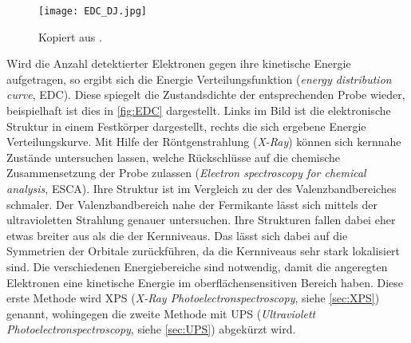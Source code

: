         \begin{figure}
            \centering
            \texttt{[image: EDC\_DJ.jpg]}
            \caption{Kopiert aus \cite{oura_surface_2003}.}
            \label{fig:EDC}
        \end{figure}
        Wird die Anzahl detektierter Elektronen gegen ihre kinetische Energie aufgetragen, so ergibt sich die Energie Verteilungsfunktion (\textit{energy distribution curve}, EDC).
        Diese spiegelt die Zustandsdichte der entsprechenden Probe wieder, beispielhaft ist dies in \autoref{fig:EDC} dargestellt.
        Links im Bild ist die elektronische Struktur in einem Festkörper dargestellt, rechts die sich ergebene Energie Verteilungskurve.
        Mit Hilfe der Röntgenstrahlung (\textit{X-Ray}) können sich kernnahe Zustände untersuchen lassen, welche Rückschlüsse auf die chemische Zusammensetzung der Probe zulassen (\textit{Electron spectroscopy for chemical analysis}, ESCA).
        Ihre Struktur ist im Vergleich zu der des Valenzbandbereiches schmaler.
        Der Valenzbandbereich nahe der Fermikante lässt sich mittels der ultravioletten Strahlung genauer untersuchen.
        Ihre Strukturen fallen dabei eher etwas breiter aus als die der Kernniveaus.
        Das lässt sich dabei auf die Symmetrien der Orbitale zurückführen, da die Kernniveaus sehr stark lokalisiert sind.
        Die verschiedenen Energiebereiche sind notwendig, damit die angeregten Elektronen eine kinetische Energie im oberflächensensitiven Bereich haben.
        Diese erste Methode wird XPS (\textit{X-Ray Photoelectronspectroscopy}, siehe \autoref{sec:XPS}) genannt, wohingegen die zweite Methode mit UPS (\textit{Ultraviolett Photoelectronspectroscopy}, siehe \autoref{sec:UPS}) abgekürzt wird.
        
